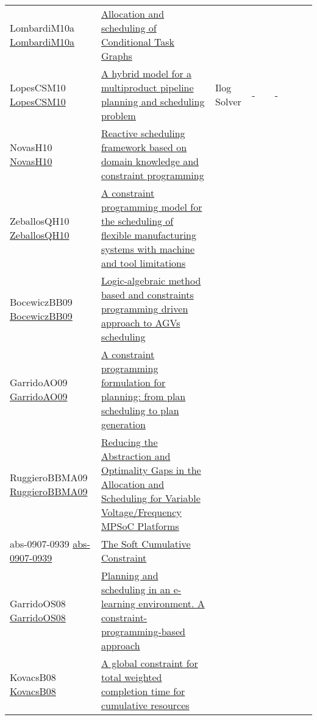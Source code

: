 {\begin{longtable}{p{3cm}p{7cm}lllllll}
LombardiM10a \href{https://doi.org/10.1016/j.artint.2010.02.004}{LombardiM10a} &  \href{articles/LombardiM10a.pdf}{Allocation and scheduling of Conditional Task Graphs} &  &  &  &  &  &  & \\
LopesCSM10 \href{https://doi.org/10.1007/s10601-009-9086-z}{LopesCSM10} &  \href{articles/LopesCSM10.pdf}{A hybrid model for a multiproduct pipeline planning and scheduling problem} & Ilog Solver & - &  & - & \cite{MouraSCL08,MouraSCL08a} &  & \\
NovasH10 \href{https://doi.org/10.1016/j.compchemeng.2010.07.011}{NovasH10} &  \href{articles/NovasH10.pdf}{Reactive scheduling framework based on domain knowledge and constraint programming} &  &  &  &  &  &  & \\
ZeballosQH10 \href{https://doi.org/10.1016/j.engappai.2009.07.002}{ZeballosQH10} &  \href{articles/ZeballosQH10.pdf}{A constraint programming model for the scheduling of flexible manufacturing systems with machine and tool limitations} &  &  &  &  &  &  & \\
BocewiczBB09 \href{https://doi.org/10.1504/IJIIDS.2009.023038}{BocewiczBB09} &  \href{}{Logic-algebraic method based and constraints programming driven approach to AGVs scheduling} &  &  &  &  &  &  & \\
GarridoAO09 \href{https://doi.org/10.1007/s10951-008-0083-7}{GarridoAO09} &  \href{articles/GarridoAO09.pdf}{A constraint programming formulation for planning: from plan scheduling to plan generation} &  &  &  &  &  &  & \\
RuggieroBBMA09 \href{https://doi.org/10.1109/TCAD.2009.2013536}{RuggieroBBMA09} &  \href{articles/RuggieroBBMA09.pdf}{Reducing the Abstraction and Optimality Gaps in the Allocation and Scheduling for Variable Voltage/Frequency MPSoC Platforms} &  &  &  &  &  &  & \\
abs-0907-0939 \href{http://arxiv.org/abs/0907.0939}{abs-0907-0939} &  \href{articles/abs-0907-0939.pdf}{The Soft Cumulative Constraint} &  &  &  &  &  &  & \\
GarridoOS08 \href{https://doi.org/10.1016/j.engappai.2008.03.009}{GarridoOS08} &  \href{articles/GarridoOS08.pdf}{Planning and scheduling in an e-learning environment. {A} constraint-programming-based approach} &  &  &  &  &  &  & \\
KovacsB08 \href{https://doi.org/10.1016/j.engappai.2008.03.004}{KovacsB08} &  \href{articles/KovacsB08.pdf}{A global constraint for total weighted completion time for cumulative resources} &  &  &  &  &  &  & \\

\end{longtable}}
